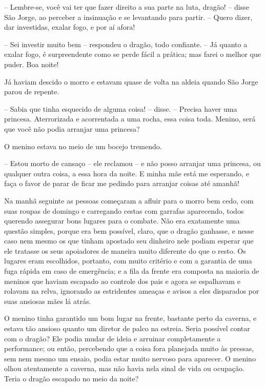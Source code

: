 -- Lembre-se, você vai ter que fazer direito a sua parte na luta,
dragão! -- disse São Jorge, ao perceber a insinuação e se levantando
para partir. -- Quero dizer, dar investidas, exalar fogo, e por aí
afora!

-- Sei investir muito bem -- respondeu o dragão, todo confiante. -- Já
quanto a exalar fogo, é surpreendente como se perde fácil a prática;
mas farei o melhor que puder. Boa noite!

Já haviam descido o morro e estavam quase de volta na aldeia quando
São Jorge parou de repente.

-- Sabia que tinha esquecido de alguma coisa! -- disse. -- Precisa haver
uma princesa. Aterrorizada e acorrentada a uma rocha, essa coisa
toda. Menino, será que você não podia arranjar uma princesa?

O menino estava no meio de um bocejo tremendo.

-- Estou morto de cansaço -- ele reclamou -- e não posso arranjar uma
princesa, ou qualquer outra coisa, a essa hora da noite. E minha mãe
está me esperando, e faça o favor de parar de ficar me pedindo para
arranjar coisas até amanhã!


\bigskip

Na manhã seguinte as pessoas começaram a afluir para o morro bem cedo,
com suas roupas de domingo e carregando cestas com garrafas
aparecendo, todos querendo assegurar bons lugares para o combate. Não
era exatamente uma questão simples, porque era bem possível, claro,
que o dragão ganhasse, e nesse caso nem mesmo os que tinham apostado
seu dinheiro nele podiam esperar que ele tratasse os seus apoiadores
de maneira muito diferente do que o resto. Os lugares eram
escolhidos, portanto, com muito critério e com a garantia de uma fuga
rápida em caso de emergência; e a fila da frente era composta na
maioria de meninos que haviam escapado ao controle dos pais e agora
se espalhavam e rolavam na relva, ignorando as estridentes ameaças e
avisos a eles disparados por suas ansiosas mães lá atrás.

O menino tinha garantido um bom lugar na frente, bastante perto da
caverna, e estava tão ansioso quanto um diretor de palco na estreia.
Seria possível contar com o dragão? Ele podia mudar de ideia e
arruinar completamente a performance; ou então, percebendo que a
coisa fora planejada muito às pressas, sem nem mesmo um ensaio, podia
estar muito nervoso para aparecer. O menino olhou atentamente a
caverna, mas não havia nela sinal de vida ou ocupação. Teria o dragão
escapado no meio da noite?

